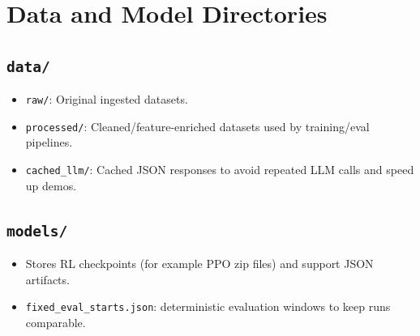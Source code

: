 \documentclass[11pt]{article}
\begin{document}
\section{Data and Model Directories}
\subsection*{\texttt{data/}}
\begin{itemize}[leftmargin=1.2em]
    \item \texttt{raw/}: Original ingested datasets.
    \item \texttt{processed/}: Cleaned/feature-enriched datasets used by training/eval pipelines.
    \item \texttt{cached\_llm/}: Cached JSON responses to avoid repeated LLM calls and speed up demos.
\end{itemize}

\subsection*{\texttt{models/}}
\begin{itemize}[leftmargin=1.2em]
    \item Stores RL checkpoints (for example PPO zip files) and support JSON artifacts.
    \item \texttt{fixed\_eval\_starts.json}: deterministic evaluation windows to keep runs comparable.
\end{itemize}
\end{document}
